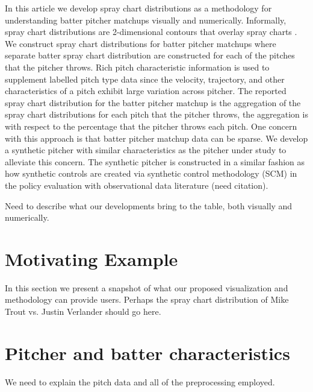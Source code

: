 \documentclass[11pt]{article}
\begin{document}
In this article we develop spray chart distributions as a methodology for understanding batter pitcher matchups visually and numerically. Informally, spray chart distributions are 2-dimensional contours that overlay spray charts \citep[Section 12]{marchi2019analyzing}. We construct spray chart distributions for batter pitcher matchups where separate batter spray chart distribution are  constructed for each of the pitches that the pitcher throws. Rich pitch characteristic information is used to supplement labelled pitch type data since the velocity, trajectory, and other characteristics of a pitch exhibit large variation across pitcher. The reported spray chart distribution for the batter pitcher matchup is the aggregation of the spray chart distributions for each pitch that the pitcher throws, the aggregation is with respect to the percentage that the pitcher throws each pitch.
One concern with this approach is that batter pitcher matchup data can be sparse. We develop a synthetic pitcher with similar characteristics as the pitcher under study to alleviate this concern. The synthetic pitcher is constructed in a similar fashion as how synthetic controls are created via synthetic control methodology (SCM) \citep{abadie2010synthetic} in the policy evaluation with observational data literature (need citation).


Need to describe what our developments bring to the table, both visually and numerically.

\section{Motivating Example}

In this section we present a snapshot of what our proposed visualization and methodology can provide users. Perhaps the spray chart distribution of Mike Trout vs. Justin Verlander should go here.


\section{Pitcher and batter characteristics}

We need to explain the pitch data and all of the preprocessing employed. 
\end{document}

